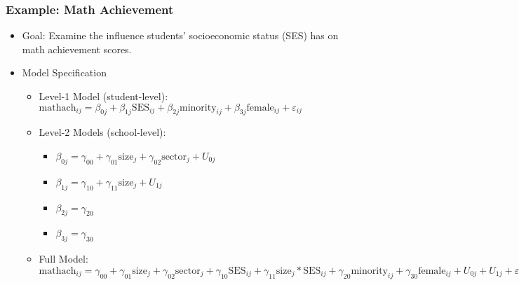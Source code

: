 \documentclass{beamer}
\begin{document}
\begin{frame}
	\frametitle{Example: Math Achievement}
		\begin{itemize}
			\item Goal: Examine the influence students' socioeconomic status (SES) has on math achievement scores.
			\item Model Specification
				\begin{itemize}
					\item Level-1 Model (student-level): $\mbox{mathach}_{ij}=\beta_{0j}+\beta_{1j}\mbox{SES}_{ij}+\beta_{2j}\mbox{minority}_{ij}+\beta_{3j}\mbox{female}_{ij}+\varepsilon_{ij}$
					\item Level-2 Models (school-level):
						\begin{itemize}
							\item $\beta_{0j}=\gamma_{00}+\gamma_{01}\mbox{size}_{j}+\gamma_{02}\mbox{sector}_{j}+U_{0j}$
							\item $\beta_{1j}=\gamma_{10}+\gamma_{11}\mbox{size}_{j}+U_{1j}$
							\item $\beta_{2j}=\gamma_{20}$
							\item $\beta_{3j}=\gamma_{30}$
						\end{itemize}
					\item Full Model: $\mbox{mathach}_{ij}=\gamma_{00}+\gamma_{01}\mbox{size}_{j}+\gamma_{02}\mbox{sector}_{j}+\gamma_{10}\mbox{SES}_{ij}+\gamma_{11}\mbox{size}_{j}*\mbox{SES}_{ij}+\gamma_{20}\mbox{minority}_{ij}+\gamma_{30}\mbox{female}_{ij}+U_{0j}+U_{1j}+\varepsilon_{ij}$
				\end{itemize}
		\end{itemize}
\end{frame}
\end{document}
